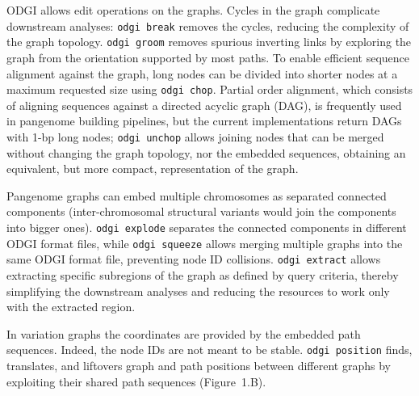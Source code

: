 \documentclass{bioinfo}
\begin{document}
    ODGI allows edit operations on the graphs. Cycles in the graph complicate downstream analyses: \texttt{odgi break}
    removes the cycles, reducing the complexity of the graph topology. \texttt{odgi groom} removes spurious inverting
    links by exploring the graph from the orientation supported by most paths. To enable efficient sequence alignment
    against the graph, long nodes can be divided into shorter nodes at a maximum requested size using
    \texttt{odgi chop}. Partial order alignment, which consists of aligning sequences against a directed acyclic graph
    (DAG), is frequently used in pangenome building pipelines, but the current implementations return DAGs with 1-bp
    long nodes; \texttt{odgi unchop} allows joining nodes that can be merged without changing the graph topology, nor
    the embedded sequences, obtaining an equivalent, but more compact, representation of the graph.

    Pangenome graphs can embed multiple chromosomes as separated connected components (inter-chromosomal structural
    variants would join the components into bigger ones). \texttt{odgi explode} separates the connected components in
    different ODGI format files, while \texttt{odgi squeeze} allows merging multiple graphs into the same ODGI format
    file, preventing node ID collisions. \texttt{odgi extract} allows extracting specific subregions of the graph as
    defined by query criteria, thereby simplifying the downstream analyses and reducing the resources to work only
    with the extracted region.

    In variation graphs the coordinates are provided by the embedded path sequences. Indeed, the node IDs are not
    meant to be stable. \texttt{odgi position} finds, translates, and liftovers graph and path positions between
    different graphs by exploiting their shared path sequences (Figure~1.B\vphantom{\ref{fig:01}}).
\end{document}
